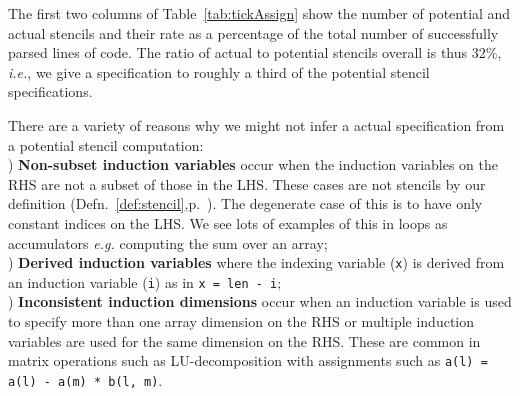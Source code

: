\documentclass[9pt,preprint]{sigplanconf}
\theoremstyle{definition}
\newcommand{\ie}{\emph{i.e.}}
\newcommand{\eg}{\emph{e.g.}}
\begin{document}
The first two columns of Table~\ref{tab:tickAssign} show the number
of potential and actual stencils and their rate as a percentage of the
total number of successfully parsed lines of code. The ratio of
actual to potential stencils overall is thus $32\%$, \ie{}, we give
a specification to roughly a third of the potential stencil specifications.

There are a variety of reasons why we might not infer a actual specification from a potential
stencil computation: \\
) \textbf{Non-subset induction variables} occur when the
induction variables on the RHS are not a subset of those in the LHS. These
cases are not stencils by our definition (Defn.~\ref{def:stencil},p.~\pageref{def:stencil}). The degenerate case of this
is to have only constant indices on the LHS. We see lots of examples
of this in loops as accumulators \eg{} computing the sum over an array; \\
) \textbf{Derived induction variables} where the
indexing variable (\texttt{x}) is derived from an
induction variable (\texttt{i}) as in
\texttt{x = len - i};  \\
) \textbf{Inconsistent induction dimensions} occur when
an induction variable is used to specify more than one array dimension
on the RHS or multiple induction variables are used for the same
dimension on the RHS. These are common in matrix operations such as
LU-decomposition with assignments such as
\texttt{a(l) = a(l) - a(m) * b(l, m)}.



\end{document}
